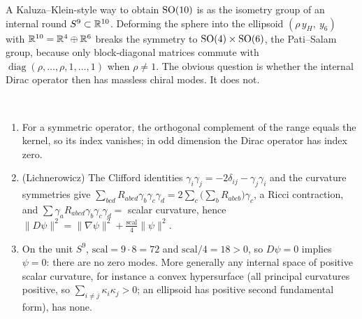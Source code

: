 A Kaluza--Klein-style way to obtain $\mathrm{SO}(10)$ is as the isometry group of an internal round $S^9\subset\mathbb{R}^{10}$. Deforming the sphere into the ellipsoid $(\rho\,y_H,\ y_6)$ with $\mathbb{R}^{10}=\mathbb{R}^4\oplus\mathbb{R}^6$ breaks the symmetry to $\mathrm{SO}(4)\times\mathrm{SO}(6)$, the Pati--Salam group, because only block-diagonal matrices commute with $\operatorname{diag}(\rho,\dots,\rho,1,\dots,1)$ when $\rho\ne1$. The obvious question is whether the internal Dirac operator then has massless chiral modes. It does not.

\begin{theorem}\label{thm:s9nogo}\ver\nogo\
\begin{enumerate}[label=(\roman*)]
\item For a symmetric operator, the orthogonal complement of the range equals the kernel, so its index vanishes; in odd dimension the Dirac operator has index zero.
\item (Lichnerowicz) The Clifford identities $\gamma_i\gamma_j=-2\delta_{ij}-\gamma_j\gamma_i$ and the curvature symmetries give $\sum_{bcd}R_{abcd}\gamma_b\gamma_c\gamma_d=2\sum_c\bigl(\sum_bR_{abcb}\bigr)\gamma_c$, a Ricci contraction, and $\sum\gamma_aR_{abcd}\gamma_b\gamma_c\gamma_d=$ scalar curvature, hence $\|D\psi\|^2=\|\nabla\psi\|^2+\frac{\mathrm{scal}}4\|\psi\|^2$.
\item On the unit $S^9$, $\mathrm{scal}=9\cdot8=72$ and $\mathrm{scal}/4=18>0$, so $D\psi=0$ implies $\psi=0$: there are no zero modes. More generally any internal space of positive scalar curvature, for instance a convex hypersurface (all principal curvatures positive, so $\sum_{i\ne j}\kappa_i\kappa_j>0$; an ellipsoid has positive second fundamental form), has none.
\end{enumerate}
\end{theorem}
